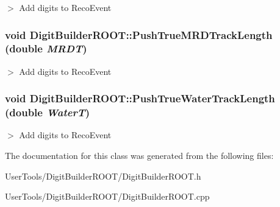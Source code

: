 $>$ Add digits to RecoEvent \hypertarget{classDigitBuilderROOT_adca0d96fa944b38e44e2ebb8a619f77b}{
\subsubsection[{PushTrueMRDTrackLength}]{\setlength{\rightskip}{0pt plus 5cm}void DigitBuilderROOT::PushTrueMRDTrackLength (double {\em MRDT})}}
\label{classDigitBuilderROOT_adca0d96fa944b38e44e2ebb8a619f77b}


$>$ Add digits to RecoEvent \hypertarget{classDigitBuilderROOT_a7edde994bef160f405d740b5e9b01176}{
\subsubsection[{PushTrueWaterTrackLength}]{\setlength{\rightskip}{0pt plus 5cm}void DigitBuilderROOT::PushTrueWaterTrackLength (double {\em WaterT})}}
\label{classDigitBuilderROOT_a7edde994bef160f405d740b5e9b01176}


$>$ Add digits to RecoEvent 

The documentation for this class was generated from the following files:\begin{DoxyCompactItemize}
\item 
UserTools/DigitBuilderROOT/DigitBuilderROOT.h\item 
UserTools/DigitBuilderROOT/DigitBuilderROOT.cpp\end{DoxyCompactItemize}
